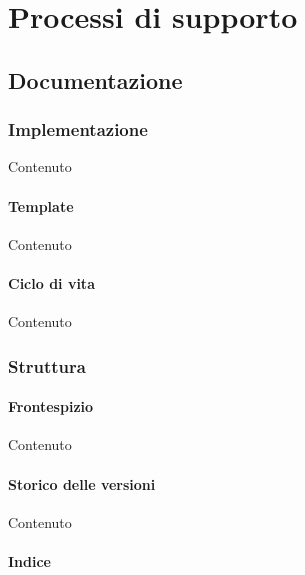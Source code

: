 
\section{Processi di supporto}\label{PS}

	\subsection{Documentazione}\label{PS:Documentazione}


		\subsubsection{Implementazione}\label{PS:Documentazione:Implementazione}
		Contenuto

			\paragraph{Template}\label{PS:Documentazione:Implementazione:Template}
			Contenuto

			\paragraph{Ciclo di vita}\label{PS:Documentazione:Implementazione:CicloVita}
			Contenuto

		\subsubsection{Struttura}\label{PS:Documentazione:Struttura}

			\paragraph{Frontespizio}\label{PS:Documentazione:Struttura:Frontespizio}
			Contenuto

			\paragraph{Storico delle versioni}\label{PS:Documentazione:Struttura:StoricoVersioni}
			Contenuto

			\paragraph{Indice}\label{PS:Documentazione:Struttura:Indice}

